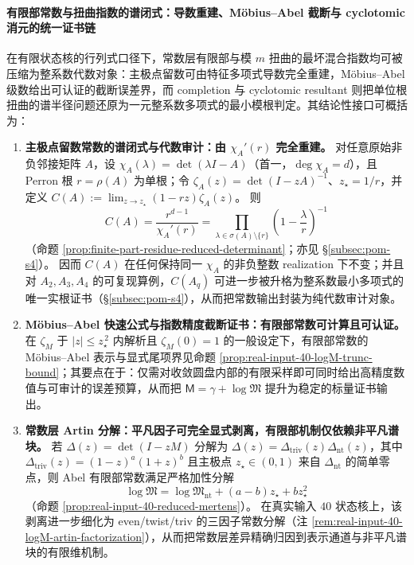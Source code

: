\paragraph{有限部常数与扭曲指数的谱闭式：导数重建、Möbius--Abel 截断与 cyclotomic 消元的统一证书链}
在有限状态核的行列式口径下，常数层有限部与模 \(m\) 扭曲的最坏混合指数均可被压缩为整系数代数对象：主极点留数可由特征多项式导数完全重建，Möbius--Abel 级数给出可认证的截断误差界，而 completion 与 cyclotomic resultant 则把单位根扭曲的谱半径问题还原为一元整系数多项式的最小模根判定。其结论性接口可概括为：
\begin{enumerate}
  \item \textbf{主极点留数常数的谱闭式与代数审计：由 \texorpdfstring{$\chi_A'(r)$}{chi'(r)} 完全重建。}
  对任意原始非负邻接矩阵 \(A\)，设 \(\chi_A(\lambda)=\det(\lambda I-A)\)（首一，\(\deg\chi_A=d\)），且 Perron 根 \(r=\rho(A)\) 为单根；令 \(\zeta_A(z)=\det(I-zA)^{-1}\)、\(z_\star=1/r\)，并定义
  \(
  C(A):=\lim_{z\to z_\star}(1-rz)\zeta_A(z)
  \)。
  则
  \[
  \boxed{\;
  C(A)=\frac{r^{d-1}}{\chi_A'(r)}
  =\prod_{\lambda\in\sigma(A)\setminus\{r\}}\left(1-\frac{\lambda}{r}\right)^{-1}\;}
  \]
  （命题 \ref{prop:finite-part-residue-reduced-determinant}；亦见 \S\ref{subsec:pom-s4}）。
  因而 \(C(A)\) 在任何保持同一 \(\chi_A\) 的非负整数 realization 下不变；并且对 \(A_2,A_3,A_4\) 的可复现算例，\(C(A_q)\) 可进一步被升格为整系数最小多项式的唯一实根证书（\S\ref{subsec:pom-s4}），从而把常数输出封装为纯代数审计对象。

  \item \textbf{Möbius--Abel 快速公式与指数精度截断证书：有限部常数可计算且可认证。}
  在 \(\zeta_M\) 于 \(|z|\le z_\star^{\,2}\) 内解析且 \(\zeta_M(0)=1\) 的一般设定下，有限部常数的 Möbius--Abel 表示与显式尾项界见命题 \ref{prop:real-input-40-logM-trunc-bound}；其要点在于：仅需对收敛圆盘内部的有限采样即可同时给出高精度数值与可审计的误差预算，从而把 \(\mathsf{M}=\gamma+\log\mathfrak{M}\) 提升为稳定的标量证书输出。

  \item \textbf{常数层 Artin 分解：平凡因子可完全显式剥离，有限部机制仅依赖非平凡谱块。}
  若 \(\Delta(z)=\det(I-zM)\) 分解为 \(\Delta(z)=\Delta_{\mathrm{triv}}(z)\Delta_{\mathrm{nt}}(z)\)，其中 \(\Delta_{\mathrm{triv}}(z)=(1-z)^a(1+z)^b\) 且主极点 \(z_\star\in(0,1)\) 来自 \(\Delta_{\mathrm{nt}}\) 的简单零点，则 Abel 有限部常数满足严格加性分解
  \[
  \boxed{\ \log\mathfrak{M}=\log\mathfrak{M}_{\mathrm{nt}}+(a-b)z_\star+b z_\star^2\ }
  \]
  （命题 \ref{prop:real-input-40-reduced-mertens}）。
  在真实输入 \(40\) 状态核上，该剥离进一步细化为 even/twist/triv 的三因子常数分解（注 \ref{rem:real-input-40-logM-artin-factorization}），从而把常数层差异精确归因到表示通道与非平凡谱块的有限维机制。


\end{enumerate}
